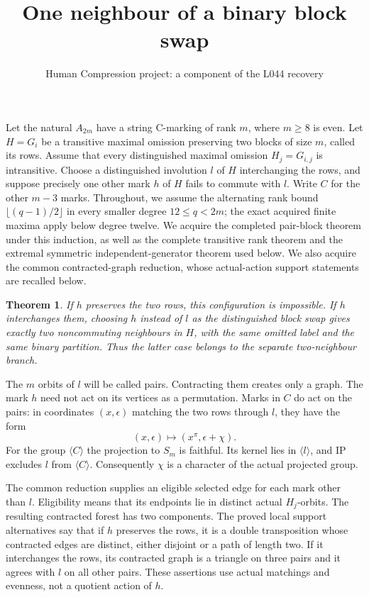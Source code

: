 \documentclass[11pt,a4paper]{article}
\title{One neighbour of a binary block swap}
\author{Human Compression project: a component of the L044 recovery}
\date{}
\newtheorem{theorem}[lemma]{Theorem}
\newcommand{\gen}[1]{\langle#1\rangle}
\begin{document}
\maketitle
Let the natural $A_{2m}$ have a string C-marking of rank $m$,
where $m\ge8$ is even. Let $H=G_i$ be a transitive maximal
omission preserving two blocks of size $m$, called its rows.
Assume that every distinguished maximal omission $H_j=G_{i,j}$
is intransitive. Choose a distinguished involution $l$ of $H$
interchanging the rows, and suppose precisely one other mark $h$
of $H$ fails to commute with $l$. Write $C$ for the other $m-3$
marks. Throughout, we assume the alternating rank bound
$\lfloor(q-1)/2\rfloor$ in every smaller degree $12\le q<2m$;
the exact acquired finite maxima apply below degree twelve.
We acquire the completed pair-block theorem under this induction,
as well as the complete transitive rank theorem and the extremal
symmetric independent-generator theorem used below.
We also acquire the common contracted-graph reduction, whose
actual-action support statements are recalled below.

\begin{theorem}\label{main}
If $h$ preserves the two rows, this configuration is impossible.
If $h$ interchanges them, choosing $h$ instead of $l$ as the
distinguished block swap gives exactly two noncommuting neighbours
in $H$, with the same omitted label and the same binary partition.
Thus the latter case belongs to the separate two-neighbour branch.
\end{theorem}

The $m$ orbits of $l$ will be called pairs. Contracting them creates
only a graph. The mark $h$ need not act on its vertices as a
permutation. Marks in $C$ do act on the pairs: in coordinates
$(x,\epsilon)$ matching the two rows through $l$, they have the form
\[
                 (x,\epsilon)\longmapsto
                       (x^{\pi},\epsilon+\chi).
                                                        \tag{1}
\]
For the group $\gen C$ the projection to $S_m$ is faithful.
Its kernel lies in $\gen l$, and IP excludes $l$ from $\gen C$.
Consequently $\chi$ is a character of the actual projected group.

The common reduction supplies an eligible selected edge for each
mark other than $l$. Eligibility means that its endpoints lie in
distinct actual $H_j$-orbits. The resulting contracted forest has
two components. The proved local support alternatives say that if
$h$ preserves the rows, it is a double transposition whose contracted
edges are distinct, either disjoint or a path of length two. If it
interchanges the rows, its contracted graph is a triangle on three
pairs and it agrees with $l$ on all other pairs. These assertions
use actual matchings and evenness, not a quotient action of $h$.
\end{document}

